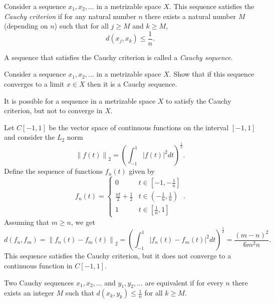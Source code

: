 \begin{definition}
Consider a sequence $x_1, x_2, \ldots$ in a metrizable space $X$.
This sequence satisfies the \emph{Cauchy criterion} if for any natural number $n$ there exists a natural number $M$ (depending on $n$) such that for all $j \geq M$ and $k \geq M$,
\begin{equation*}
d \left( x_j, x_k \right) \leq \frac{1}{n}.
\end{equation*}
\end{definition}

A sequence that satisfies the Cauchy criterion is called a \emph{Cauchy sequence}.

\begin{problem}
Consider a sequence $x_1, x_2, \ldots$ in a metrizable space $X$.
Show that if this sequence converges to a limit $x \in X$ then it is a Cauchy sequence.
\end{problem}

It is possible for a sequence in a metrizable space $X$ to satisfy the Cauchy criterion, but not to converge in $X$.

\begin{example}
Let $C[-1,1]$ be the vector space of continuous functions on the interval $[-1,1]$ and consider the $L_2$ norm
\begin{equation*}
\left\| f(t) \right\|_2 = \left( \int_{-1}^1 |f(t)|^2 dt \right)^{\frac{1}{2}}.
\end{equation*}
Define the sequence of functions $f_n(t)$ given by
\begin{equation*}
f_n(t) = \left\{ \begin{array}{ll}
0 & t \in \left[ -1, -\frac{1}{n} \right] \\
\frac{nt}{2} + \frac{1}{2} & t \in \left( -\frac{1}{n}, \frac{1}{n} \right) \\
1 & t \in \left[ \frac{1}{n}, 1 \right]
\end{array} \right. .
\end{equation*}
Assuming that $m \geq n$, we get
\begin{equation*}
d(f_n, f_m) = \left\| f_n(t) - f_m(t) \right\|_2
= \left( \int_{-1}^1 |f_n(t) - f_m(t)|^2 dt \right)^{\frac{1}{2}}
= \frac{(m-n)^2}{6m^2n}.
\end{equation*}
This sequence satisfies the Cauchy criterion, but it does not converge to a continuous function in $C[-1,1]$.
\end{example}

\begin{definition}
Two Cauchy sequences $x_1, x_2, \ldots$ and $y_1, y_2, \ldots$ are equivalent if for every $n$ there exists an integer $M$ such that $d (x_k, y_k) \leq \frac{1}{n}$ for all $k \geq M$.
\end{definition}

